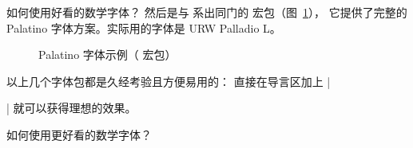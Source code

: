 \begin{myQA}{如何使用好看的数学字体？}
然后是与  系出同门的 
 宏包（图~\ref{Fig:pxfonts}），
它提供了完整的 Palatino 字体方案。实际用的字体是 URW Palladio L。

\begin{figure}[h]
	\centering
	\caption{Palatino 字体示例（ 宏包）}
	\label{Fig:pxfonts}
\end{figure}

以上几个字体包都是久经考验且方便易用的：
直接在导言区加上 \code|\usepackage{*|\optional{宏包名}|*}|
就可以获得理想的效果。
\end{myQA}

\begin{myQA}{如何使用更好看的数学字体？}
\end{myQA}